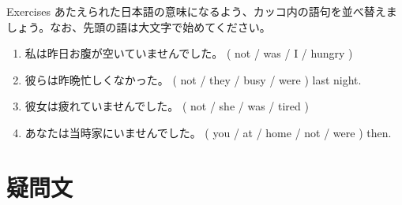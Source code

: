 \documentclass[aspectratio=169,xcolor={dvipsnames,table}]{beamer}
\newcommand{\myaudio}[1]{\href{#1}{\faVolumeUp}}
\begin{document}
\begin{frame}[plain]{Exercises}
あたえられた日本語の意味になるよう、カッコ内の語句を並べ替えましょう。なお、先頭の語は大文字で始めてください。 

\begin{enumerate}
 \item 私は昨日お腹が空いていませんでした。
( not / was / I / hungry )\\
 \item 
彼らは昨晩忙しくなかった。
( not / they / busy / were ) last night.\\
 \item 
彼女は疲れていませんでした。
( not / she / was / tired )\\
 \item 
あなたは当時家にいませんでした。
( you / at / home / not / were ) then.\\
\end{enumerate}

\hfill\myaudio{./audio/024_past_be_05.mp3}

\end{frame}


\section{疑問文}
\end{document}
